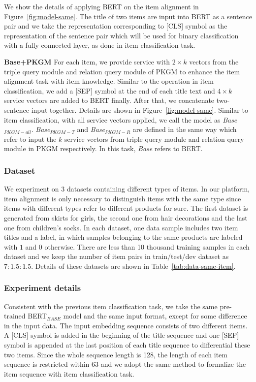 We show the details of applying BERT on the item alignment in Figure~\ref{fig:model-same}. The title of two items are input into BERT as a sentence pair and we take the representation corresponding to [CLS] symbol as the representation of the sentence pair which will be used for binary classification with a fully connected layer, as done in item classification task. 

\textbf{Base+PKGM}
For each item, we provide service with $2\times k$ vectors from the triple query module and relation query module of PKGM to enhance the item alignment task with item knowledge. Similar to the operation in item classification, we add a [SEP] symbol at the end of each title text and  $4\times k$ service vectors are added to BERT finally. After that, we concatenate two-sentence input together. Details are shown in Figure~\ref{fig:model-same}. Similar to item classification, with all service vectors applied, we call the model as \emph{Base$_{PKGM-all}$}. \emph{Base$_{PKGM-T}$} and \emph{Base$_{PKGM-R}$} are defined in the same way which refer to input the $k$ service vectors from triple query module and relation query module in PKGM respectively. In this task, \emph{Base} refers to BERT.

\subsubsection{Dataset}
We experiment on $3$ datasets containing different types of items. In our platform, item alignment is only necessary to distinguish items with the same type since items with different types refer to different products for sure. The first dataset is generated from skirts for girls, the second one from hair decorations and the last one from children's socks.  In each dataset, one data sample includes two item titles and a label, in which samples belonging to the same products are labeled with $1$ and $0$ otherwise. There are less than 10 thousand training samples in each dataset and we keep the number of item pairs in train/test/dev dataset as $7:1.5:1.5$. Details of these datasets are shown in Table~\ref{tab:data-same-item}.




\subsubsection{Experiment details}
Consistent with the previous item classification task, we take the same pre-trained BERT$_{BASE}$ model and the same input format, except for some difference in the input data. The input embedding sequence consists of two different items. A [CLS] symbol is added in the beginning of the title sequence  and one [SEP] symbol is appended at the last position of each title sequence to differential these two items. Since the whole sequence length is 128, the length of each item sequence is restricted within 63 and we adopt the same method to formalize the item sequence with item classification task.


